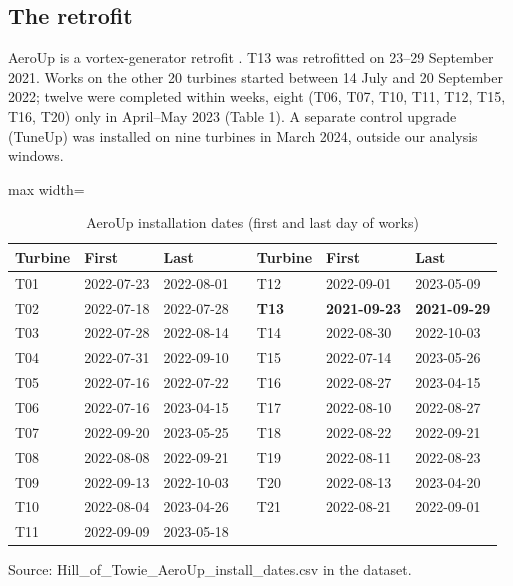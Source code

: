 \documentclass[preprint,12pt]{elsarticle}
\begin{document}
\subsection{The retrofit}

AeroUp is a vortex-generator retrofit \cite{clerc}. T13 was retrofitted on 23--29 September 2021. Works on the other 20 turbines started between 14 July and 20 September 2022; twelve were completed within weeks, eight (T06, T07, T10, T11, T12, T15, T16, T20) only in April--May 2023 (Table 1). A separate control upgrade (TuneUp) was installed on nine turbines in March 2024, outside our analysis windows.

\begin{table}[!htbp]
\centering
\caption{AeroUp installation dates (first and last day of works)}
\label{tab:install}
\small
\begin{adjustbox}{max width=\textwidth}
\begin{tabular}{lllllll}
\toprule
Turbine & First & Last &  & Turbine & First & Last \\
\midrule
T01 & 2022-07-23 & 2022-08-01 &  & T12 & 2022-09-01 & 2023-05-09 \\
T02 & 2022-07-18 & 2022-07-28 &  & \textbf{T13} & \textbf{2021-09-23} & \textbf{2021-09-29} \\
T03 & 2022-07-28 & 2022-08-14 &  & T14 & 2022-08-30 & 2022-10-03 \\
T04 & 2022-07-31 & 2022-09-10 &  & T15 & 2022-07-14 & 2023-05-26 \\
T05 & 2022-07-16 & 2022-07-22 &  & T16 & 2022-08-27 & 2023-04-15 \\
T06 & 2022-07-16 & 2023-04-15 &  & T17 & 2022-08-10 & 2022-08-27 \\
T07 & 2022-09-20 & 2023-05-25 &  & T18 & 2022-08-22 & 2022-09-21 \\
T08 & 2022-08-08 & 2022-09-21 &  & T19 & 2022-08-11 & 2022-08-23 \\
T09 & 2022-09-13 & 2022-10-03 &  & T20 & 2022-08-13 & 2023-04-20 \\
T10 & 2022-08-04 & 2023-04-26 &  & T21 & 2022-08-21 & 2022-09-01 \\
T11 & 2022-09-09 & 2023-05-18 &  &  &  &  \\
\bottomrule
\end{tabular}
\end{adjustbox}

\par\smallskip\parbox{0.95\textwidth}{\footnotesize Source: Hill\_of\_Towie\_AeroUp\_install\_dates.csv in the dataset.}
\end{table}
\end{document}
